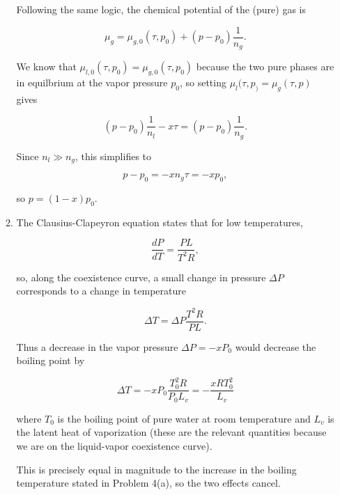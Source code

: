 \documentclass{article}
\begin{document}
\begin{enumerate}
\begin{enumerate}
		Following the same logic, the chemical potential of the (pure) gas is

		$$\mu_g = \mu_{g,0}(\tau, p_0) + (p - p_0) \frac{1}{n_g}.$$

		We know that $\mu_{l,0}(\tau, p_0) = \mu_{g,0}(\tau, p_0)$ because the two pure phases are in equilbrium at the vapor pressure $p_0$, so setting $\mu_l(\tau, p_) = \mu_g(\tau, p)$ gives

		$$(p - p_0) \frac{1}{n_l} - x\tau = (p - p_0) \frac{1}{n_g}.$$

		Since $n_l \gg n_g$, this simplifies to

		$$p - p_0 = -xn_g\tau = -xp_0,$$

		so $p = (1-x)p_0$.

		\item

		The Clausius-Clapeyron equation states that for low temperatures,

		$$\frac{dP}{dT} = \frac{PL}{T^2R},$$

		so, along the coexistence curve, a small change in pressure $\Delta P$ corresponds to a change in temperature

		$$\Delta T = \Delta P \frac{T^2R}{PL}.$$

		Thus a decrease in the vapor pressure $\Delta P = -xP_0$ would decrease the boiling point by

		$$\Delta T = -xP_0 \frac{T_0^2R}{P_0L_v} = -\frac{xRT_0^2}{L_v}$$

		where $T_0$ is the boiling point of pure water at room temperature and $L_v$ is the latent heat of vaporization (these are the relevant quantities because we are on the liquid-vapor coexistence curve).

		This is precisely equal in magnitude to the increase in the boiling temperature stated in Problem 4(a), so the two effects cancel.

	\end{enumerate}

\end{enumerate}
\end{document}
